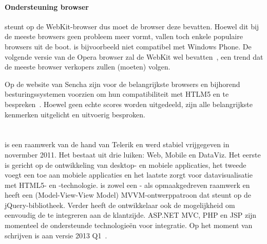 \paragraph{Ondersteuning browser}
\st{} steunt op de WebKit-browser  dus moet de browser deze bevatten.  
Hoewel dit bij de meeste browsers geen probleem meer vormt, vallen toch enkele populaire browsers uit de boot.  
\st{} is bijvoorbeeld niet compatibel met Windows Phone.
De volgende versie van de Opera browser zal de WebKit  wel bevatten~\cite{Wokke2013}, een trend dat de meeste browser verkopers zullen (moeten) volgen.


Op de website van Sencha zijn voor de belangrijkste browsers en bijhorend besturingssystemen  voorzien om hun compatibiliteit met HTLM5 en \st{} te bespreken~\cite{Inc.}.
Hoewel geen echte scores worden uitgedeeld, zijn alle belangrijkste kenmerken uitgelicht en uitvoerig besproken. 


\section{\kendo}
\label{sec:raamwerk-kendo}
\kendo{} is een raamwerk van de hand van Telerik en werd stabiel vrijgegeven in novermber 2011.
Het bestaat uit drie luiken:  Web, Mobile en DataViz.  
Het eerste is gericht op de ontwikkeling van desktop- en mobiele applicaties,  het tweede voegt een  toe aan mobiele applicaties en het laatste zorgt voor datavisualisatie met HTML5- en \js{}-technologie.
\kendo{} is zowel een \js{}- als opmaakgedreven raamwerk en heeft een (Model-View-View Model) MVVM-ontwerppatroon dat steunt op de jQuery-bibliotheek.
Verder heeft de ontwikkelaar ook de mogelijkheid om eenvoudig de  te integreren aan de klantzijde.
ASP.NET MVC,  PHP en JSP zijn momenteel de ondersteunde technologieën voor integratie.
Op het moment van schrijven is \kendo{} aan versie 2013 Q1~\cite{Telerike}. 

